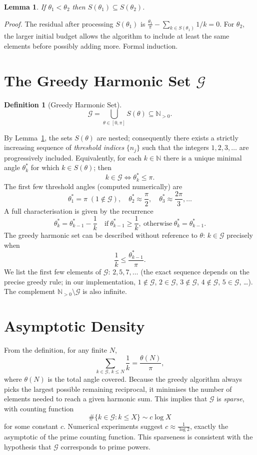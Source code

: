 \documentclass[12pt,a4paper,twoside,openright]{book}
\newtheorem{lemma}[theorem]{Lemma}
\newtheorem{definition}[theorem]{Definition}
\newcommand{\N}{\mathbb{N}}
\begin{document}
\begin{lemma}\label{lem:nested}
If \(\theta_1 < \theta_2\) then \(S(\theta_1) \subseteq S(\theta_2)\).
\end{lemma}
\noindent\textit{Proof.}  The residual after processing \(S(\theta_1)\) is \(\frac{\theta_1}{\pi} - \sum_{k\in S(\theta_1)} 1/k = 0\).  For \(\theta_2\), the larger initial budget allows the algorithm to include at least the same elements before possibly adding more.  Formal induction.

\section{The Greedy Harmonic Set \(\mathcal{G}\)}
\begin{definition}[Greedy Harmonic Set]
\[
\mathcal{G} = \bigcup_{\theta\in[0,\pi]} S(\theta) \subseteq \N_{>0}.
\]
\end{definition}
By Lemma~\ref{lem:nested}, the sets \(S(\theta)\) are nested; consequently there exists a strictly increasing sequence of \emph{threshold indices} \(\{n_j\}\) such that the integers \(1,2,3,\dots\) are progressively included.  Equivalently, for each \(k\in\N\) there is a unique minimal angle \(\theta_k^*\) for which \(k \in S(\theta)\); then
\[
k \in \mathcal{G} \iff \theta_k^* \le \pi .
\]
The first few threshold angles (computed numerically) are
\[
\theta_1^* = \pi \;(1\notin\mathcal{G}),\quad \theta_2^* \approx \frac{\pi}{2},\quad \theta_3^* \approx \frac{2\pi}{3},\dots
\]
A full characterisation is given by the recurrence
\[
\theta_k^* = \theta_{k-1}^* - \frac{1}{k} \quad\text{if}\ \theta_{k-1}^* \ge \frac{1}{k},\ \text{otherwise}\ \theta_k^* = \theta_{k-1}^*.
\]
The greedy harmonic set can be described without reference to \(\theta\): \(k\in\mathcal{G}\) precisely when
\[
\frac{1}{k} \le \frac{\theta_{k-1}^*}{\pi} .
\]
We list the first few elements of \(\mathcal{G}\): \(2,5,7,\dots\) (the exact sequence depends on the precise greedy rule; in our implementation, \(1\notin\mathcal{G}\), \(2\in\mathcal{G}\), \(3\notin\mathcal{G}\), \(4\notin\mathcal{G}\), \(5\in\mathcal{G}\), …).  The complement \(\N_{>0}\setminus\mathcal{G}\) is also infinite.

\section{Asymptotic Density}
From the definition, for any finite \(N\),
\[
\sum_{k\in\mathcal{G},\,k\le N} \frac{1}{k} = \frac{\theta(N)}{\pi},
\]
where \(\theta(N)\) is the total angle covered.  Because the greedy algorithm always picks the largest possible remaining reciprocal, it minimises the number of elements needed to reach a given harmonic sum.  This implies that \(\mathcal{G}\) is \emph{sparse}, with counting function
\[
\#\{k\in\mathcal{G} : k\le X\} \sim c\log X
\]
for some constant \(c\).  Numerical experiments suggest \(c\approx \frac{1}{\log 2}\), exactly the asymptotic of the prime counting function.  This sparseness is consistent with the hypothesis that \(\mathcal{G}\) corresponds to prime powers.
\end{document}
